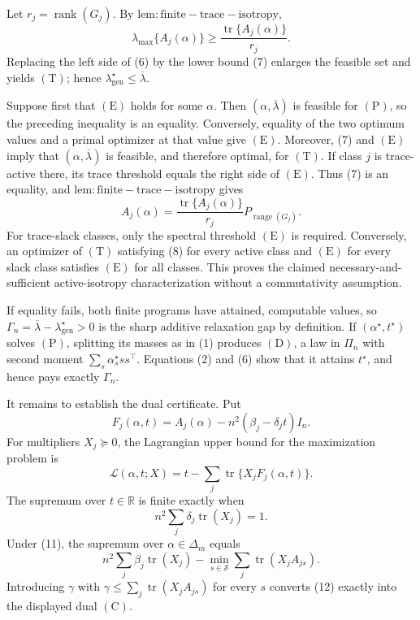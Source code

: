 Let \(r_j=\operatorname{rank}(G_j)\).  By \(\mathrm{lem:finite-trace-isotropy}\),
\[
\lambda_{\max}\{A_j(\alpha)\}
\ge\frac{\operatorname{tr}\{A_j(\alpha)\}}{r_j}. \tag{7}
\]
Replacing the left side of (6) by the lower bound (7) enlarges the feasible set and yields \((\mathrm T)\); hence \(\lambda_{\mathrm{gen}}^\star\le\overline\lambda\).

Suppose first that \((\mathrm E)\) holds for some \(\alpha\).  Then \((\alpha,\overline\lambda)\) is feasible for \((\mathrm P)\), so the preceding inequality is an equality.  Conversely, equality of the two optimum values and a primal optimizer at that value give \((\mathrm E)\).  Moreover, (7) and \((\mathrm E)\) imply that \((\alpha,\overline\lambda)\) is feasible, and therefore optimal, for \((\mathrm T)\).  If class \(j\) is trace-active there, its trace threshold equals the right side of \((\mathrm E)\).  Thus (7) is an equality, and \(\mathrm{lem:finite-trace-isotropy}\) gives
\[
A_j(\alpha)
=\frac{\operatorname{tr}\{A_j(\alpha)\}}{r_j}
P_{\operatorname{range}(G_j)}. \tag{8}
\]
For trace-slack classes, only the spectral threshold \((\mathrm E)\) is required.  Conversely, an optimizer of \((\mathrm T)\) satisfying (8) for every active class and \((\mathrm E)\) for every slack class satisfies \((\mathrm E)\) for all classes.  This proves the claimed necessary-and-sufficient active-isotropy characterization without a commutativity assumption.

If equality fails, both finite programs have attained, computable values, so
\(\Gamma_n=\overline\lambda-\lambda_{\mathrm{gen}}^\star>0\) is the sharp additive relaxation gap by definition.  If \((\alpha^\star,t^\star)\) solves \((\mathrm P)\), splitting its masses as in (1) produces \((\mathrm D)\), a law in \(\Pi_n\) with second moment \(\sum_s\alpha_s^\star ss^\top\).  Equations (2) and (6) show that it attains \(t^\star\), and hence pays exactly \(\Gamma_n\).

It remains to establish the dual certificate.  Put
\[
F_j(\alpha,t)=A_j(\alpha)-n^2(\beta_j-\delta_jt)I_n. \tag{9}
\]
For multipliers \(X_j\succeq0\), the Lagrangian upper bound for the maximization problem is
\[
\mathcal L(\alpha,t;X)
=t-\sum_j\operatorname{tr}\{X_jF_j(\alpha,t)\}. \tag{10}
\]
The supremum over \(t\in\mathbb R\) is finite exactly when
\[
n^2\sum_j\delta_j\operatorname{tr}(X_j)=1. \tag{11}
\]
Under (11), the supremum over \(\alpha\in\Delta_m\) equals
\[
n^2\sum_j\beta_j\operatorname{tr}(X_j)
-\min_{s\in\mathscr S}\sum_j\operatorname{tr}(X_jA_{js}). \tag{12}
\]
Introducing \(\gamma\) with
\(\gamma\le\sum_j\operatorname{tr}(X_jA_{js})\) for every \(s\) converts (12) exactly into the displayed dual \((\mathrm C)\).

